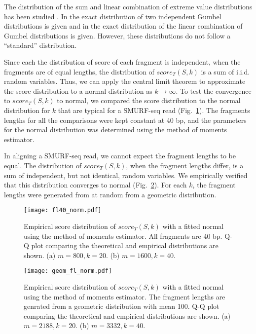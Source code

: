 The distribution of the sum and linear combination of extreme value
distributions has been studied \citep{cetinkaya2001scalable,
marques2015distribution,loaiciga1999analysis,nadarajah2008exact}.  In
\citep{loaiciga1999analysis} the exact distribution of two independent
Gumbel distributions is given and in \citep{nadarajah2008exact} the exact
distribution of the linear combination of Gumbel distributions is given.
%
However, these distributions do not follow a ``standard'' distribution.

Since each the distribution of score of each fragment is independent,
when the fragments are of equal lengths, the distribution of
$score_T(S,k)$ is a sum of i.i.d. random variables. Thus, we can apply
the central limit theorem to approximate the score distribution to a
normal distribution as $k \to \infty$. To test the convergence to
$score_T(S,k)$ to normal, we compared the score distribution to the
normal distribution for $k$ that are typical for a SMURF-seq read
(Fig.~\ref{norm_const}). The fragments lengths for all the comparisons
were kept constant at 40 bp, and the parameters for the normal
distribution was determined using the method of moments estimator.

In aligning a SMURF-seq read, we cannot expect the fragment lengths to
be equal. The distribution of $score_T(S,k)$, when the fragment lengths
differ, is a sum of independent, but not identical, random variables. We
empirically verified that this distribution converges to normal
(Fig.~\ref{norm_geom}). For each $k$, the fragment lengths were
generated from at random from a geometric distribution.

\begin{figure}[H]
\centering
\texttt{[image: fl40\_norm.pdf]}
\caption{Empirical score distribution of $score_T(S,k)$ with a fitted
  normal using the method of moments estimator. All fragments are 40 bp.
  Q-Q plot comparing the theoretical and empirical distributions are shown.
  (a) $m=800, k=20$.
  (b) $m=1600, k=40$.}
\label{norm_const}
\end{figure}

\begin{figure}[H]
\centering
\texttt{[image: geom\_fl\_norm.pdf]}
\caption{Empirical score distribution of $score_T(S,k)$ with a fitted
  normal using the method of moments estimator. The fragment lengths are
  genrated from a geometric distribution with mean 100. Q-Q plot comparing
  the theoretical and empirical distributions are shown.
  (a) $m=2188, k=20$.
  (b) $m=3332, k=40$.}
\label{norm_geom}
\end{figure}

